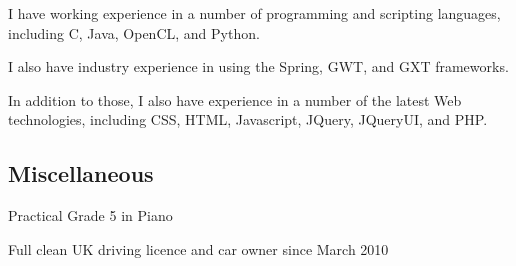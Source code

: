\documentclass[11pt,a4paper]{article}
\begin{document}
I have working experience in a number of programming and scripting languages,
including C, Java, OpenCL, and Python.

I also have industry experience in using the Spring, GWT, and GXT frameworks.

In addition to those, I also have experience in a number of the latest Web
technologies, including CSS, HTML, Javascript, JQuery, JQueryUI, and PHP.

\subsection*{Miscellaneous}

Practical Grade 5 in Piano

Full clean UK driving licence and car owner since March 2010

\end{document}
